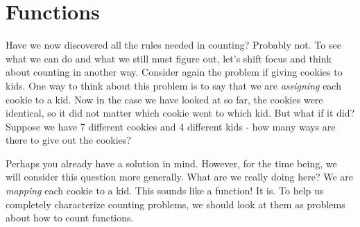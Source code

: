 \documentclass[12pt]{article}
\begin{document}
\section{Functions}

Have we now discovered all the rules needed in counting?  Probably not.  To see what we can do and what we still must figure out, let's shift focus and think about counting in another way.  Consider again the problem if giving cookies to kids.  One way to think about this problem is to say that we are {\em assigning} each cookie to a kid.  Now in the case we have looked at so far, the cookies were identical, so it did not matter which cookie went to which kid.  But what if it did?  Suppose we have 7 different cookies and 4 different kids - how many ways are there to give out the cookies?

Perhaps you already have a solution in mind.  However, for the time being, we will consider this question more generally.  What are we really doing here?  We are {\em mapping} each cookie to a kid.  This sounds like a function!  It is.  To help us completely characterize counting problems, we should look at them as problems about how to count functions.  %
\end{document}
